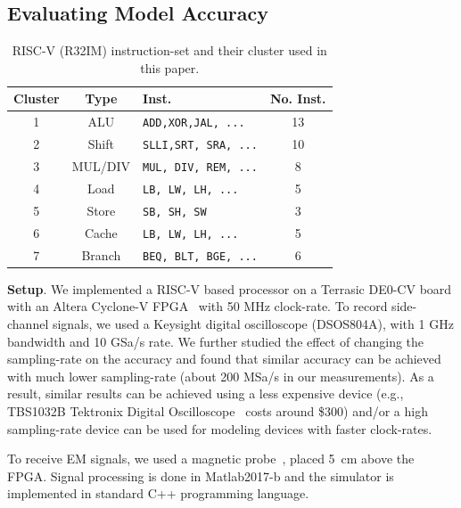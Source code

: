\documentclass[11 pt]{article}
\begin{document}
\subsection{Evaluating Model Accuracy}
\begin{table}
\centering
\caption{RISC-V (R32IM) instruction-set and their cluster used in this paper.}
	\begin{tabular}{|c|c|l|c|}
		\hline
		\small Cluster& \small Type & \small Inst. & \small No. Inst. \\
		\hline
		1& \small ALU & {\tt ADD,XOR,JAL, ...}  & 13 \\
		\hline
		2& \small Shift & {\tt SLLI,SRT, SRA, ...}  & 10 \\
		\hline
		3& \small MUL/DIV & {\tt MUL, DIV, REM, ...} & 8 \\
		\hline
		4& \small Load & {\tt LB, LW, LH, ...} & 5 \\
		\hline
		5& \small Store & {\tt SB, SH, SW}  & 3 \\
		\hline
		6& \small Cache &  {\tt LB, LW, LH, ...} & 5 \\
		\hline
		7& \small Branch & {\tt BEQ, BLT, BGE, ...} & 6 \\
		\hline
	\end{tabular}
	\label{t:inst}
\end{table}

\label{subss:eval}
\noindent\textbf{Setup}. We implemented a RISC-V based processor on a Terrasic DE0-CV board with an Altera Cyclone-V FPGA~\cite{de0} with 50 MHz clock-rate.  To record side-channel signals, we used a Keysight digital oscilloscope (DSOS804A), with 1 GHz bandwidth and 10 GSa/s rate. We further studied the effect of changing the sampling-rate on the accuracy and found that similar accuracy can be achieved with much lower sampling-rate (about 200 MSa/s in our measurements). As a result, similar results can be achieved using a less expensive device (e.g., TBS1032B Tektronix Digital Oscilloscope~\cite{oscTek} costs around \$300) and/or a high sampling-rate device can be used for modeling devices with faster clock-rates.

To receive EM signals, we used a magnetic probe~\cite{Antenna}, placed 5~cm above the FPGA. Signal processing is done in Matlab2017-b and the simulator is implemented in standard C++ programming language. \\
\end{document}
